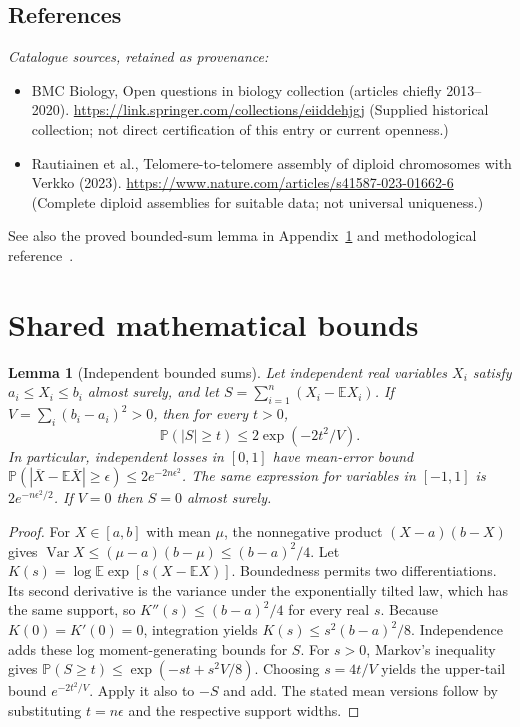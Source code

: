 \documentclass[11pt]{article}
\newcommand{\E}{\mathbb E}
\newcommand{\Prob}{\mathbb P}
\DeclareMathOperator{\Var}{Var}
\providecommand{\E}{\mathbb E}
\providecommand{\Prob}{\mathbb P}
\providecommand{\Var}{\operatorname{Var}}
\newtheorem{sharedlemma}{Lemma}[section]
\begin{document}
\subsection{References}
\noindent\emph{Catalogue sources, retained as provenance:}
\begin{itemize}
\item BMC Biology, Open questions in biology collection (articles chiefly 2013--2020). \url{https://link.springer.com/collections/eiiddehjgj} (Supplied historical collection; not direct certification of this entry or current openness.)
\item Rautiainen et al., Telomere-to-telomere assembly of diploid chromosomes with Verkko (2023). \url{https://www.nature.com/articles/s41587-023-01662-6} (Complete diploid assemblies for suitable data; not universal uniqueness.)
\end{itemize}
\noindent See also the proved bounded-sum lemma in Appendix~\ref{app:bounds} and methodological reference~\cite{hoeffding}.
\clearpage


\appendix
\section{Shared mathematical bounds}\label{app:bounds}
\begin{sharedlemma}[Independent bounded sums]\label{lem:bounded}
Let independent real variables $X_i$ satisfy $a_i\leq X_i\leq b_i$ almost surely,
and let $S=\sum_{i=1}^n(X_i-\E X_i)$. If
$V=\sum_i(b_i-a_i)^2>0$, then for every $t>0$,
\[
 \Prob(|S|\geq t)\leq 2\exp(-2t^2/V).
\]
In particular, independent losses in $[0,1]$ have mean-error bound
$\Prob(|\overline X-\E\overline X|\geq\epsilon)
\leq2e^{-2n\epsilon^2}$. The same expression for variables in $[-1,1]$
is $2e^{-n\epsilon^2/2}$. If $V=0$ then $S=0$ almost surely.
\end{sharedlemma}
\begin{proof}
For $X\in[a,b]$ with mean $\mu$, the nonnegative product
$(X-a)(b-X)$ gives
$\Var X\leq(\mu-a)(b-\mu)\leq(b-a)^2/4$.
Let $K(s)=\log\E\exp[s(X-\E X)]$.
Boundedness permits two differentiations. Its second derivative is the variance
under the exponentially tilted law, which has the same support, so
$K''(s)\leq(b-a)^2/4$ for every real $s$.
Because $K(0)=K'(0)=0$, integration yields
$K(s)\leq s^2(b-a)^2/8$.
Independence adds these log moment-generating bounds for $S$.
For $s>0$, Markov's inequality gives
$\Prob(S\geq t)\leq\exp(-st+s^2V/8)$.
Choosing $s=4t/V$ yields the upper-tail bound $e^{-2t^2/V}$.
Apply it also to $-S$ and add. The stated mean versions follow by substituting
$t=n\epsilon$ and the respective support widths.
\end{proof}
\end{document}
